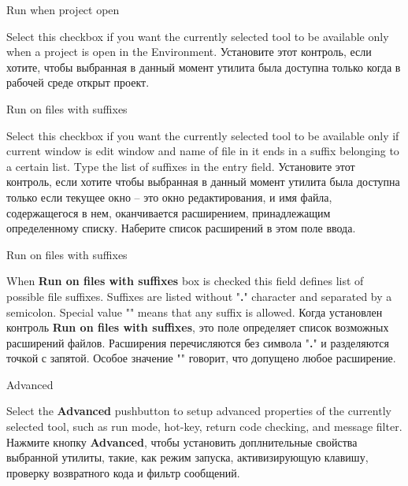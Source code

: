 \begin{popup}
\caption{Run when project open}

\ifenglish
Select this checkbox if you want the currently selected tool to be
available only when a project is open in the Environment.
 \else
Установите этот контроль, если хотите, чтобы выбранная в данный момент утилита 
была доступна только когда в рабочей среде открыт проект.
\fi
\end{popup}

\begin{popup}
\caption{Run on files with suffixes}

\ifenglish
Select this checkbox if you want the currently selected tool to be
available only if current window is edit window and name of file in it
ends in a suffix belonging to a certain list. Type the list of suffixes
in the entry field.
 \else
Установите этот контроль, если хотите чтобы выбранная в данный момент утилита
была доступна только если текущее окно -- это окно редактирования, и имя файла,
содержащегося в нем, оканчивается расширением, принадлежащим определенному 
списку. Наберите список расширений в этом поле ввода.
\fi
\end{popup}

\begin{popup}
\caption{Run on files with suffixes}

\ifenglish
When {\bf Run on files with suffixes} box is checked this field defines
list of possible file suffixes. Suffixes are listed without "{\bf .}"
character and separated by a semicolon. Special value "{\bf *}" means that
any suffix is allowed.
 \else
Когда установлен контроль {\bf Run on files with suffixes}, это поле определяет
список возможных расширений файлов. Расширения перечисляются без символа "{\bf .}"
и разделяются точкой с запятой. Особое значение "{\bf *}" говорит, что допущено
любое расширение.
\fi
\end{popup}

\begin{popup}
\caption{Advanced}

\ifenglish
Select the {\bf Advanced} pushbutton to setup advanced properties of
the currently selected tool, such as run mode, hot-key, return code
checking, and message filter.
 \else
Нажмите кнопку {\bf Advanced}, чтобы установить доплнительные свойства 
выбранной утилиты, такие, как режим запуска, активизирующую клавишу, проверку 
возвратного кода и фильтр сообщений.
\fi
\end{popup}


